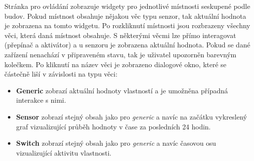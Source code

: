 Stránka pro ovládání zobrazuje widgety pro jednotlivé místnosti seskupené podle budov. Pokud místnost obsahuje nějakou věc typu senzor, tak aktuální hodnota je zobrazena na tomto widgetu. Po rozkliknutí místnosti jsou rozbrazeny všechny věci, která daná místnost obsahuje. S některými věcmi lze přímo interagovat (přepínač a aktivátor) a u senzoru je zobrazena aktuální hodnota. Pokud se dané zařízení nenachází v připraveném stavu, tak je uživatel upozorněn barevným kolečkem. Po kliknutí na název věci je zobrazeno dialogové okno, které se částečně liší v závislosti na typu věci:
\begin{itemize}
    \item \textbf{Generic} zobrazí aktuální hodnoty vlastností a je umožněna případná interakce s nimi.
    \item \textbf{Sensor} zobrazí stejný obsah jako pro \textit{generic} a navíc na začátku vykreslený graf vizualizující průběh hodnoty v čase za posledních 24 hodin.
    \item \textbf{Switch} zobrazí stejný obsah jako pro \textit{generic} a navíc časovou osu vizualizující aktivitu vlastnosti.
\end{itemize}

